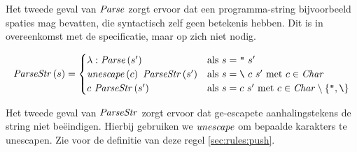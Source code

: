 Het tweede geval van $\mathit{Parse}$ zorgt ervoor dat een programma-string
bijvoorbeeld spaties mag bevatten, die syntactisch zelf geen betekenis hebben.
Dit is in overeenkomst met de specificatie, maar op zich niet nodig.

$$
	\mathit{ParseStr}\left(s\right) =
		\begin{cases}
			\lambda:\mathit{Parse}\left(s'\right) & \text{als $s=\texttt{"}~s'$} \\
			\mathit{unescape}\left(c\right)~\mathit{ParseStr}\left(s'\right) & \text{als $s=\texttt{\textbackslash}~c~s'$
				met $c \in\mathit{Char}$} \\
			c~\mathit{ParseStr}\left(s'\right) & \text{als $s=c~s'$ met $c
				\in\mathit{Char}\setminus\{\texttt{"},\texttt{\textbackslash}\}$}\\
		\end{cases}
$$

Het tweede geval van $\mathit{ParseStr}$ zorgt ervoor dat ge-escapete
aanhalingstekens de string niet beëindigen. Hierbij gebruiken we $\mathit{unescape}$
om bepaalde karakters te unescapen. Zie voor de definitie van deze regel
\autoref{sec:rules:push}.

